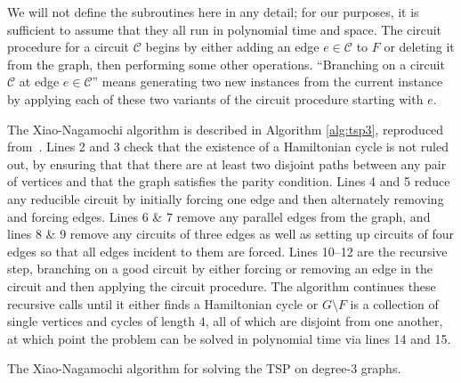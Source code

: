 We will not define the subroutines here in any detail; for our purposes, it is sufficient to assume that they all run in polynomial time and space. The circuit procedure for a circuit $\mathcal{C}$ begins by either adding an edge $e \in \mathcal{C}$ to $F$ or deleting it from the graph, then performing some other operations. ``Branching on a circuit $\mathcal{C}$ at edge $e \in \mathcal{C}$'' means generating two new instances from the current instance by applying each of these two variants of the circuit procedure starting with $e$.

The Xiao-Nagamochi algorithm is described in Algorithm \ref{alg:tsp3}, reproduced from~\cite{xiao2016degree3}. Lines 2 and 3 check that the existence of a Hamiltonian cycle is not ruled out, by ensuring that that there are at least two disjoint paths between any pair of vertices and that the graph satisfies the parity condition. Lines 4 and 5 reduce any reducible circuit by initially forcing one edge and then alternately removing and forcing edges. Lines 6 \& 7 remove any parallel edges from the graph, and lines 8 \& 9 remove any circuits of three edges as well as setting up circuits of four edges so that all edges incident to them are forced. Lines 10--12 are the recursive step, branching on a good circuit by either forcing or removing an edge in the circuit and then applying the circuit procedure. The algorithm continues these recursive calls until it either finds a Hamiltonian cycle or $G \setminus F$ is a collection of single vertices and cycles of length $4$, all of which are disjoint from one another, at which point the problem can be solved in polynomial time via lines 14 and 15.

\begin{algorithm}
\caption{\label{alg:tsp3} The Xiao-Nagamochi algorithm for solving the TSP on degree-3 graphs.}
\end{algorithm}

